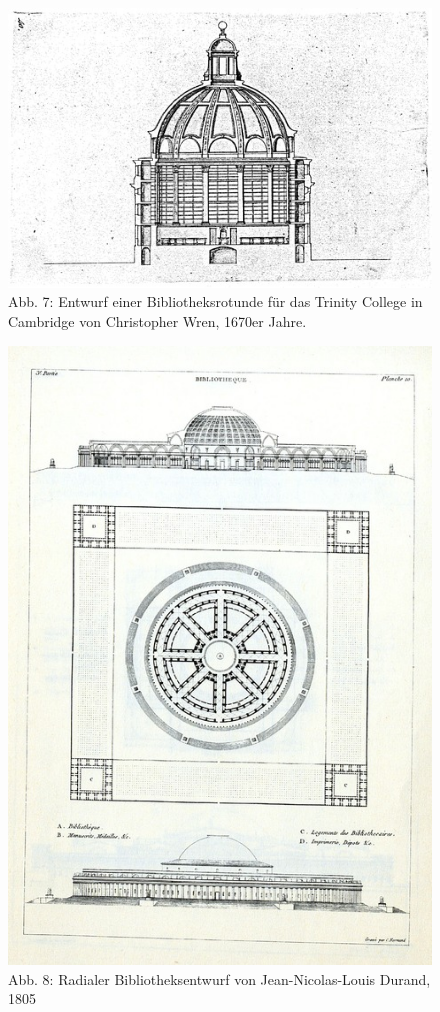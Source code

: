 \begin{figure}[htbp]
\centering
\includegraphics{img/wagner-7.jpg}
\caption{Abb. 7: Entwurf einer Bibliotheksrotunde für das Trinity
College in Cambridge von Christopher Wren, 1670er Jahre.}
\end{figure}

\begin{figure}[htbp]
\centering
\includegraphics{img/wagner-8.jpg}
\caption{Abb. 8: Radialer Bibliotheksentwurf von Jean-Nicolas-Louis
Durand, 1805}
\end{figure}


